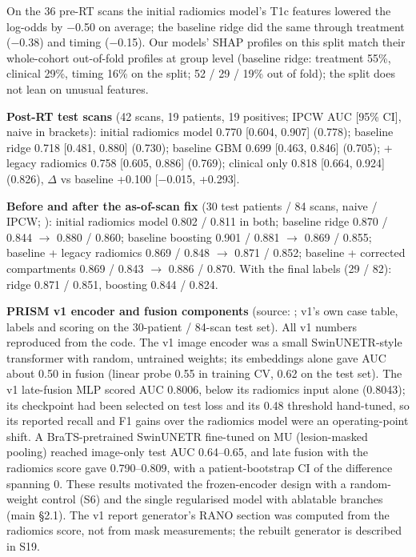 \documentclass[11pt,a4paper]{article}
\begin{document}
On the 36 pre-RT scans the initial radiomics model's T1c features lowered the log-odds by $-$0.50 on average; the
baseline ridge did the same through treatment ($-$0.38) and timing ($-$0.15). Our models' SHAP profiles on
this split match their whole-cohort out-of-fold profiles at group level (baseline ridge: treatment 55\%,
clinical 29\%, timing 16\% on the split; 52 / 29 / 19\% out of fold); the split does not lean on unusual
features.

\textbf{Post-RT test scans} (42 scans, 19 patients, 19 positives; IPCW AUC [95\% CI], naive in brackets):
initial radiomics model 0.770 [0.604, 0.907] (0.778); baseline ridge 0.718 [0.481, 0.880] (0.730); baseline GBM
0.699 [0.463, 0.846] (0.705); + legacy radiomics 0.758 [0.605, 0.886] (0.769); clinical only 0.818 [0.664,
0.924] (0.826), $\Delta$ vs baseline +0.100 [$-$0.015, +0.293].

\textbf{Before and after the as-of-scan fix} (30 test patients / 84 scans, naive / IPCW;
): initial radiomics
model 0.802 / 0.811 in both; baseline ridge 0.870 /
0.844 $\rightarrow$ 0.880 / 0.860; baseline boosting 0.901 / 0.881 $\rightarrow$ 0.869 / 0.855; baseline +
legacy radiomics 0.869 / 0.848 $\rightarrow$ 0.871 / 0.852; baseline + corrected compartments 0.869 / 0.843
$\rightarrow$ 0.886 / 0.870. With the final labels (29 / 82): ridge 0.871 / 0.851, boosting 0.844 / 0.824.

\textbf{PRISM v1 encoder and fusion components} (source: ;
v1's own case table, labels and scoring on the 30-patient / 84-scan test set). All v1 numbers reproduced from the
code. The v1 image encoder was a small SwinUNETR-style transformer with random, untrained weights; its embeddings
alone gave AUC about 0.50 in fusion (linear probe 0.55 in training CV, 0.62 on the test set). The v1 late-fusion MLP
scored AUC 0.8006, below its radiomics input alone (0.8043); its checkpoint had been selected on test loss and its
0.48 threshold hand-tuned, so its reported recall and F1 gains over the radiomics model were an operating-point
shift. A BraTS-pretrained SwinUNETR fine-tuned on MU (lesion-masked pooling) reached image-only test AUC 0.64--0.65,
and late fusion with the radiomics score gave 0.790--0.809, with a patient-bootstrap CI of the difference spanning 0.
These results motivated the frozen-encoder design with a random-weight control (S6) and the single regularised model
with ablatable branches (main \S2.1). The v1 report generator's RANO section was computed from the radiomics score,
not from mask measurements; the rebuilt generator is described in S19.
\end{document}
